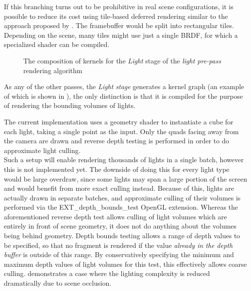 If this branching turns out to be prohibitive in real scene configurations, it is possible to reduce its cost using tile-based deferred rendering similar to the approach proposed by \citet{tiledDeferred}. The framebuffer would be split into rectangular tiles. Depending on the scene, many tiles might use just a single BRDF, for which a specialized shader can be compiled.

\begin{figure}[ht!]
  \centering
    \caption[Light Pre-Pass Stage 2]{The composition of kernels for the \emph{Light} stage of the  \emph{light pre-pass} rendering algorithm}
  \label{fig:DeferredLightingStage2}
\end{figure}

As any of the other passes, the \emph{Light stage} generates a kernel graph (an example of which is shown in ), the only distinction is that it is compiled for the purpose of rendering the bounding volumes of lights.

The current implementation uses a geometry shader to instantiate a cube for each light, taking a single point as the input. Only the quads facing away from the camera are drawn and reverse depth testing is performed in order to do approximate light culling. \\
Such a setup will enable rendering thousands of lights in a single batch, however this is not implemented yet. The downside of doing this for every light type would be large overdraw, since some lights may span a large portion of the screen and would benefit from more exact culling instead. Because of this, lights are actually drawn in separate batches, and approximate culling of their volumes is performed via the EXT\_depth\_bounds\_test OpenGL extension. Whereas the aforementioned reverse depth test allows culling of light volumes which are entirely in front of scene geometry, it does not do anything about the volumes being behind geometry. Depth bounds testing allows a range of depth values to be specified, so that no fragment is rendered if the value \emph{already in the depth buffer} is outside of this range. By conservatively specifying the minimum and maximum depth values of light volumes for this test, this effectively allows coarse culling.  demonstrates a case where the lighting complexity is reduced dramatically due to scene occlusion.

